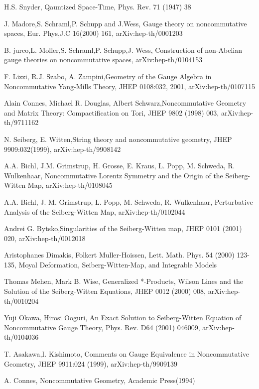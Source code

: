 \documentclass[a4paper,a4paper]{article}%
\begin{document}
\bigskip

\bigskip

\begin{thebibliography}{9}                                                                                                %

H.S. Snyder, Qauntized Space-Time, Phys. Rev. 71 (1947) 38

J. Madore,S. Schraml,P. Schupp and J.Wess, Gauge theory on
noncommutative spaces, Eur. Phys,J.C 16(2000) 161, arXiv:hep-th/0001203

B. jurco,L. Moller,S. Schraml,P. Schupp,J. Wess, Construction of
non-Abelian gauge theories on noncommutative spaces, arXiv:hep-th/0104153

F. Lizzi, R.J. Szabo, A. Zampini,Geometry of the Gauge Algebra in
Noncommutative Yang-Mills Theory, JHEP 0108:032, 2001, arXiv:hep-th/0107115

Alain Connes, Michael R. Douglas, Albert Schwarz,Noncommutative
Geometry and Matrix Theory: Compactification on Tori, JHEP 9802 (1998) 003, arXiv:hep-th/9711162

N. Seiberg, E. Witten,String theory and noncommutative geometry,
JHEP 9909:032(1999), arXiv:hep-th/9908142

A.A. Bichl, J.M. Grimstrup, H. Grosse, E. Kraus, L. Popp, M.
Schweda, R. Wulkenhaar, Noncommutative Lorentz Symmetry and the Origin of the
Seiberg-Witten Map, arXiv:hep-th/0108045

A.A. Bichl, J. M. Grimstrup, L. Popp, M. Schweda, R. Wulkenhaar,
Perturbative Analysis of the Seiberg-Witten Map, arXiv:hep-th/0102044

Andrei G. Bytsko,Singularities of the Seiberg-Witten map, JHEP
0101 (2001) 020, arXiv:hep-th/0012018

Aristophanes Dimakis, Folkert Muller-Hoissen, Lett. Math. Phys.
54 (2000) 123-135, Moyal Deformation, Seiberg-Witten-Map, and Integrable Models

Thomas Mehen, Mark B. Wise, Generalized *-Products, Wilson Lines
and the Solution of the Seiberg-Witten Equations, JHEP 0012 (2000) 008, arXiv:hep-th/0010204

Yuji Okawa, Hirosi Ooguri, An Exact Solution to Seiberg-Witten
Equation of Noncommutative Gauge Theory, Phys. Rev. D64 (2001) 046009, arXiv:hep-th/0104036

T. Asakawa,I. Kishimoto, Comments on Gauge Equivalence in
Noncommutative Geometry, JHEP 9911:024 (1999), arXiv:hep-th/9909139

A. Connes, Noncommutative Geometry, Academic Press(1994)
\end{thebibliography}
\end{document}

